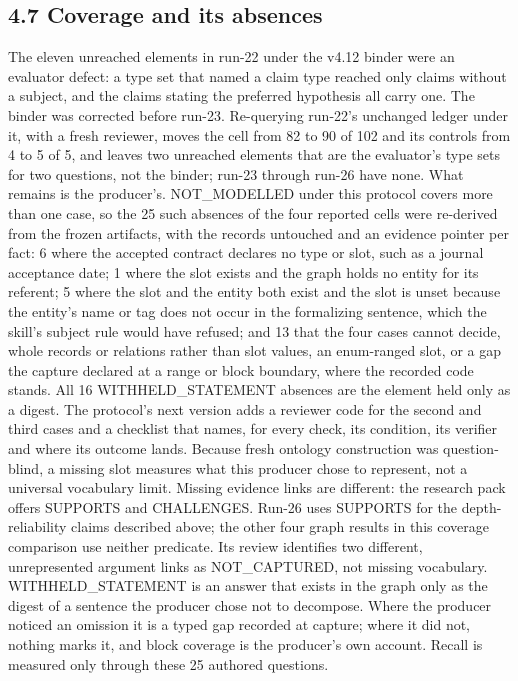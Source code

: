 \subsection*{4.7 Coverage and its absences}

The eleven unreached elements in run-22 under the v4.12 binder were an evaluator defect: a type set that named a claim type reached only claims without a subject, and the claims stating the preferred hypothesis all carry one. The binder was corrected before run-23. Re-querying run-22's unchanged ledger under it, with a fresh reviewer, moves the cell from 82 to 90 of 102 and its controls from 4 to 5 of 5, and leaves two unreached elements that are the evaluator's type sets for two questions, not the binder; run-23 through run-26 have none. What remains is the producer's. NOT\_\allowbreak{}MODELLED under this protocol covers more than one case, so the 25 such absences of the four reported cells were re-derived from the frozen artifacts, with the records untouched and an evidence pointer per fact: 6 where the accepted contract declares no type or slot, such as a journal acceptance date; 1 where the slot exists and the graph holds no entity for its referent; 5 where the slot and the entity both exist and the slot is unset because the entity's name or tag does not occur in the formalizing sentence, which the skill's subject rule would have refused; and 13 that the four cases cannot decide, whole records or relations rather than slot values, an enum-ranged slot, or a gap the capture declared at a range or block boundary, where the recorded code stands. All 16 WITHHELD\_\allowbreak{}STATEMENT absences are the element held only as a digest. The protocol's next version adds a reviewer code for the second and third cases and a checklist that names, for every check, its condition, its verifier and where its outcome lands. Because fresh ontology construction was question-blind, a missing slot measures what this producer chose to represent, not a universal vocabulary limit. Missing evidence links are different: the research pack offers SUPPORTS and CHALLENGES. Run-26 uses SUPPORTS for the depth-reliability claims described above; the other four graph results in this coverage comparison use neither predicate. Its review identifies two different, unrepresented argument links as NOT\_\allowbreak{}CAPTURED, not missing vocabulary. WITHHELD\_\allowbreak{}STATEMENT is an answer that exists in the graph only as the digest of a sentence the producer chose not to decompose. Where the producer noticed an omission it is a typed gap recorded at capture; where it did not, nothing marks it, and block coverage is the producer's own account. Recall is measured only through these 25 authored questions.

